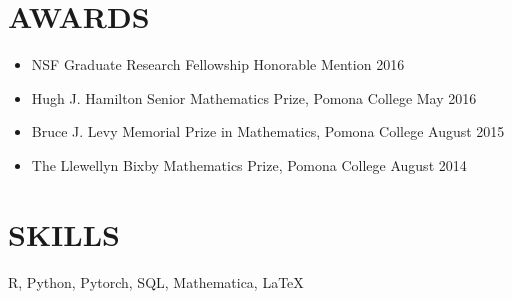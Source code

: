 \documentclass{simplecv}
\begin{document}


                
\section{AWARDS}
\begin{itemize}
  \item NSF Graduate Research Fellowship Honorable Mention \hfill 2016
  \item Hugh J. Hamilton Senior Mathematics Prize, Pomona College \hfill May 2016
  \item Bruce J. Levy Memorial Prize in Mathematics, Pomona College \hfill August 2015
  \item The Llewellyn Bixby Mathematics Prize, Pomona College \hfill August 2014
\end{itemize}

\section{SKILLS}
\noindent R, Python, Pytorch, SQL, Mathematica, \LaTeX
\end{document}
